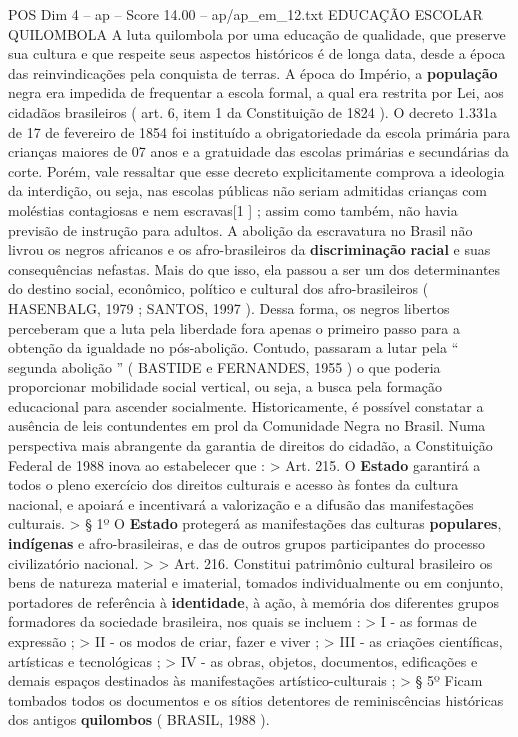 \begin{textsample}{POS Dim 4 – ap – Score 14.00 – ap/ap\_em\_12.txt}  \label{ex:f4_pos_231}
EDUCAÇÃO ESCOLAR QUILOMBOLA A luta quilombola por uma educação de qualidade, que preserve sua cultura e que respeite seus aspectos históricos é de longa data, desde a época das reinvindicações pela conquista de terras.
A época do Império, a \textbf{população} negra era impedida de frequentar a escola formal, a qual era restrita por Lei, aos cidadãos brasileiros ( art. 6, item 1 da Constituição de 1824 ).
O decreto 1.331a de 17 de fevereiro de 1854 foi instituído a obrigatoriedade da escola primária para crianças maiores de 07 anos e a gratuidade das escolas primárias e secundárias da corte.
Porém, vale ressaltar que esse decreto explicitamente comprova a ideologia da interdição, ou seja, nas escolas públicas não seriam admitidas crianças com moléstias contagiosas e nem escravas[1 ] ; assim como também, não havia previsão de instrução para adultos.
A abolição da escravatura no Brasil não livrou os negros africanos e os afro-brasileiros da \textbf{discriminação} \textbf{racial} e suas consequências nefastas.
Mais do que isso, ela passou a ser um dos determinantes do destino social, econômico, político e cultural dos afro-brasileiros ( HASENBALG, 1979 ; SANTOS, 1997 ).
Dessa forma, os negros libertos perceberam que a luta pela liberdade fora apenas o primeiro passo para a obtenção da igualdade no pós-abolição.
Contudo, passaram a lutar pela “ segunda abolição ” ( BASTIDE e FERNANDES, 1955 ) o que poderia proporcionar mobilidade social vertical, ou seja, a busca pela formação educacional para ascender socialmente.
Historicamente, é possível constatar a ausência de leis contundentes em prol da Comunidade Negra no Brasil.
Numa perspectiva mais abrangente da garantia de direitos do cidadão, a Constituição Federal de 1988 inova ao estabelecer que : > Art. 215.
O \textbf{Estado} garantirá a todos o pleno exercício dos direitos culturais e acesso às fontes da cultura nacional, e apoiará e incentivará a valorização e a difusão das manifestações culturais. > § 1º O \textbf{Estado} protegerá as manifestações das culturas \textbf{populares}, \textbf{indígenas} e afro-brasileiras, e das de outros grupos participantes do processo civilizatório nacional. > > Art. 216.
Constitui patrimônio cultural brasileiro os bens de natureza material e imaterial, tomados individualmente ou em conjunto, portadores de referência à \textbf{identidade}, à ação, à memória dos diferentes grupos formadores da sociedade brasileira, nos quais se incluem : > I - as formas de expressão ; > II - os modos de criar, fazer e viver ; > III - as criações científicas, artísticas e tecnológicas ; > IV - as obras, objetos, documentos, edificações e demais espaços destinados às manifestações artístico-culturais ; > § 5º Ficam tombados todos os documentos e os sítios detentores de reminiscências históricas dos antigos \textbf{quilombos} ( BRASIL, 1988 ).

\end{textsample}
